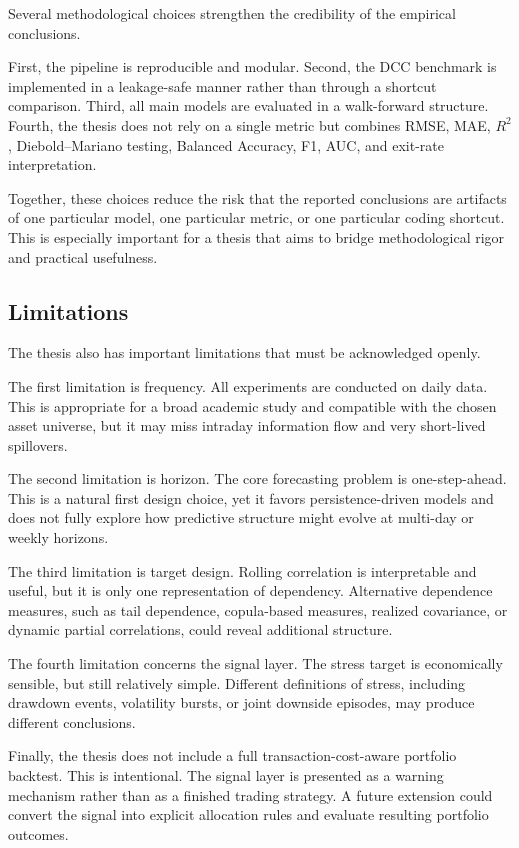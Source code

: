 Several methodological choices strengthen the credibility of the empirical conclusions.

First, the pipeline is reproducible and modular. Second, the DCC benchmark is implemented in a leakage-safe manner rather than through a shortcut comparison. Third, all main models are evaluated in a walk-forward structure. Fourth, the thesis does not rely on a single metric but combines RMSE, MAE, $R^2$, Diebold--Mariano testing, Balanced Accuracy, F1, AUC, and exit-rate interpretation.

Together, these choices reduce the risk that the reported conclusions are artifacts of one particular model, one particular metric, or one particular coding shortcut. This is especially important for a thesis that aims to bridge methodological rigor and practical usefulness.

\subsection{Limitations}

The thesis also has important limitations that must be acknowledged openly.

The first limitation is frequency. All experiments are conducted on daily data. This is appropriate for a broad academic study and compatible with the chosen asset universe, but it may miss intraday information flow and very short-lived spillovers.

The second limitation is horizon. The core forecasting problem is one-step-ahead. This is a natural first design choice, yet it favors persistence-driven models and does not fully explore how predictive structure might evolve at multi-day or weekly horizons.

The third limitation is target design. Rolling correlation is interpretable and useful, but it is only one representation of dependency. Alternative dependence measures, such as tail dependence, copula-based measures, realized covariance, or dynamic partial correlations, could reveal additional structure.

The fourth limitation concerns the signal layer. The stress target is economically sensible, but still relatively simple. Different definitions of stress, including drawdown events, volatility bursts, or joint downside episodes, may produce different conclusions.

Finally, the thesis does not include a full transaction-cost-aware portfolio backtest. This is intentional. The signal layer is presented as a warning mechanism rather than as a finished trading strategy. A future extension could convert the signal into explicit allocation rules and evaluate resulting portfolio outcomes.

